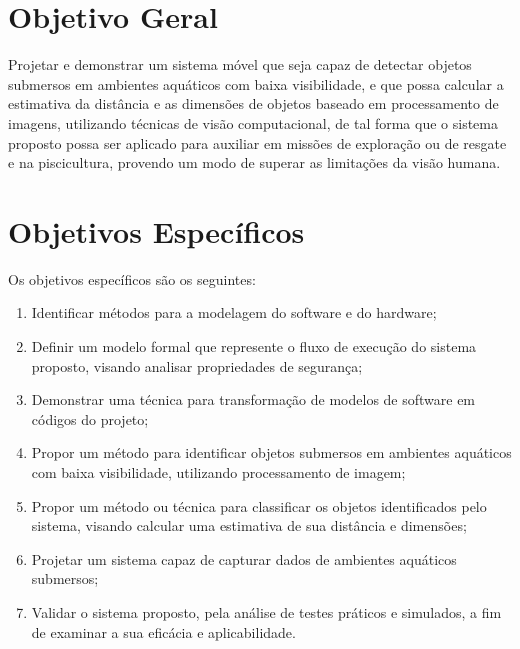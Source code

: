 

\section{Objetivo Geral}
Projetar e demonstrar um sistema móvel que seja capaz de detectar objetos submersos em ambientes aquáticos com baixa visibilidade, e que possa calcular a estimativa da distância e as dimensões de objetos baseado em processamento de imagens, utilizando técnicas de visão computacional, de tal forma que o sistema proposto possa ser aplicado para auxiliar em missões de exploração ou de resgate e na piscicultura, provendo um modo de superar as limitações da visão humana.

\section{Objetivos Específicos}
Os objetivos específicos são os seguintes:
	\begin{enumerate}
		\item Identificar métodos para a modelagem do software e do hardware;

		\item Definir um modelo formal que represente o fluxo de execução do sistema proposto, visando analisar propriedades de segurança;

		\item Demonstrar uma técnica para transformação de modelos de software em códigos do projeto;

		\item Propor um método para identificar objetos submersos em ambientes aquáticos com baixa visibilidade, utilizando processamento de imagem;

		\item Propor um método ou técnica para classificar os objetos identificados pelo sistema, visando calcular uma estimativa de sua distância e dimensões;

		\item Projetar um sistema capaz de capturar dados de ambientes aquáticos submersos;

		\item Validar o sistema proposto, pela análise de testes práticos e simulados, a fim de examinar a sua eficácia e aplicabilidade.

	\end{enumerate}
    
